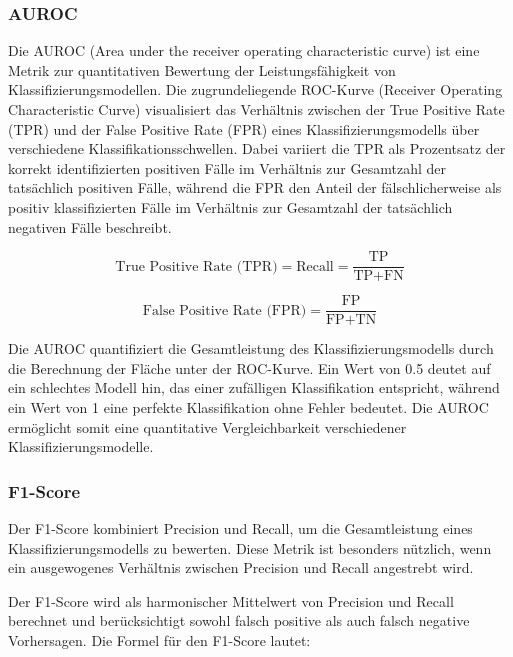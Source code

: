 \subsubsection{AUROC} \label{chap:auroc}
Die AUROC (Area under the receiver operating characteristic curve) ist eine Metrik zur quantitativen Bewertung der Leistungsfähigkeit von Klassifizierungsmodellen. Die zugrundeliegende ROC-Kurve (Receiver Operating Characteristic Curve) visualisiert das Verhältnis zwischen der True Positive Rate (TPR) und der False Positive Rate (FPR) eines Klassifizierungsmodells über verschiedene Klassifikationsschwellen. Dabei variiert die TPR als Prozentsatz der korrekt identifizierten positiven Fälle im Verhältnis zur Gesamtzahl der tatsächlich positiven Fälle, während die FPR den Anteil der fälschlicherweise als positiv klassifizierten Fälle im Verhältnis zur Gesamtzahl der tatsächlich negativen Fälle beschreibt.

\begin{equation}
    \text{True Positive Rate (TPR)} = \text{Recall} =\frac{\text{TP}}{\text{TP} + \text{FN}}
    \label{eq:TPR}
\end{equation}

\begin{equation}
    \text{False Positive Rate (FPR)} = \frac{\text{FP}}{\text{FP} + \text{TN}} 
    \label{eq:FPR}
\end{equation}

Die AUROC quantifiziert die Gesamtleistung des Klassifizierungsmodells durch die Berechnung der Fläche unter der ROC-Kurve. Ein Wert von 0.5 deutet auf ein schlechtes Modell hin, das einer zufälligen Klassifikation entspricht, während ein Wert von 1 eine perfekte Klassifikation ohne Fehler bedeutet. Die AUROC ermöglicht somit eine quantitative Vergleichbarkeit verschiedener Klassifizierungsmodelle.

\subsubsection{F1-Score} \label{chap:f1-score}
Der F1-Score kombiniert Precision und Recall, um die Gesamtleistung eines Klassifizierungsmodells zu bewerten. Diese Metrik ist besonders nützlich, wenn ein ausgewogenes Verhältnis zwischen Precision und Recall angestrebt wird.

Der F1-Score wird als harmonischer Mittelwert von Precision und Recall berechnet und berücksichtigt sowohl falsch positive als auch falsch negative Vorhersagen. Die Formel für den F1-Score lautet:

